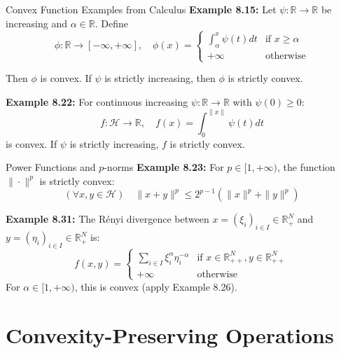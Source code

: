 \documentclass[aspectratio=169,10pt]{beamer}
\begin{document}
\begin{frame}[fragile]{Convex Function Examples from Calculus}
    \textbf{Example 8.15:} Let $\psi : \mathbb{R} \to \mathbb{R}$ be increasing and $\alpha \in \mathbb{R}$. Define
    \[
    \phi : \mathbb{R} \to [-\infty, +\infty], \quad \phi(x) = \begin{cases}
        \int_\alpha^x \psi(t) dt & \text{if } x \geq \alpha \\
        +\infty & \text{otherwise}
    \end{cases}
    \]
    
    Then $\phi$ is convex. If $\psi$ is strictly increasing, then $\phi$ is strictly convex.

    \vspace{0.3cm}

    \textbf{Example 8.22:} For continuous increasing $\psi : \mathbb{R} \to \mathbb{R}$ with $\psi(0) \geq 0$:
    \[
    f : \mathcal{H} \to \mathbb{R}, \quad f(x) = \int_0^{\|x\|} \psi(t) dt
    \]
    is convex. If $\psi$ is strictly increasing, $f$ is strictly convex.
\end{frame}

\begin{frame}[fragile]{Power Functions and $p$-norms}
    \textbf{Example 8.23:} For $p \in [1, +\infty)$, the function $\| \cdot \|^p$ is strictly convex:
    \[
    (\forall x, y \in \mathcal{H}) \quad \|x + y\|^p \leq 2^{p-1}(\|x\|^p + \|y\|^p)
    \]

    \vspace{0.3cm}

    \textbf{Example 8.31:} The Rényi divergence between $x = (\xi_i)_{i \in I} \in \mathbb{R}_+^N$ 
    and $y = (\eta_i)_{i \in I} \in \mathbb{R}_+^N$ is:
    \[
    f(x,y) = \begin{cases}
        \sum_{i \in I} \xi_i^\alpha \eta_i^{-\alpha} & \text{if } x \in \mathbb{R}_{++}^N, y \in \mathbb{R}_{++}^N \\
        +\infty & \text{otherwise}
    \end{cases}
    \]
    For $\alpha \in [1, +\infty)$, this is convex (apply Example 8.26).
\end{frame}


\section{Convexity-Preserving Operations}
\end{document}
